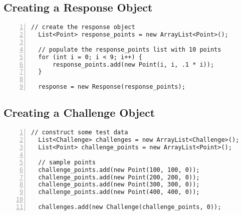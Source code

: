 \documentclass{article} %
\begin{document}
\subsection{Creating a Response Object}
\begin{lstlisting}[numbers=left]
  // create the response object
  List<Point> response_points = new ArrayList<Point>();

  // populate the response_points list with 10 points
  for (int i = 0; i < 9; i++) {
      response_points.add(new Point(i, i, .1 * i));
  }

  response = new Response(response_points);
\end{lstlisting}

\subsection{Creating a Challenge Object}
\begin{lstlisting}[numbers=left]
  // construct some test data
  List<Challenge> challenges = new ArrayList<Challenge>();
  List<Point> challenge_points = new ArrayList<Point>();

  // sample points
  challenge_points.add(new Point(100, 100, 0));
  challenge_points.add(new Point(200, 200, 0));
  challenge_points.add(new Point(300, 300, 0));
  challenge_points.add(new Point(400, 400, 0));

  challenges.add(new Challenge(challenge_points, 0));
\end{lstlisting}
\end{document}

